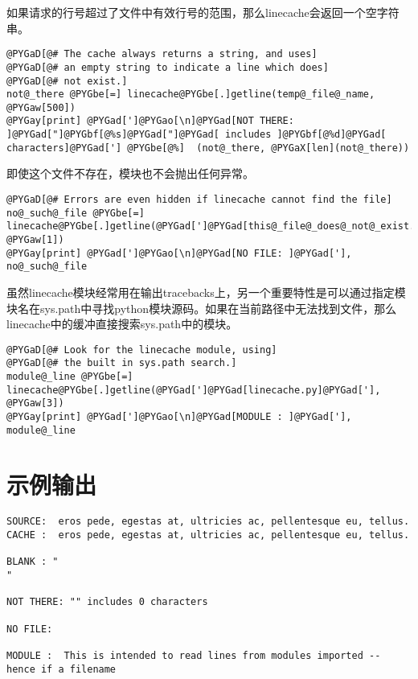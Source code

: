 \documentclass[a4paper,10pt,english]{manual}
\begin{document}
如果请求的行号超过了文件中有效行号的范围，那么linecache会返回一个空字符串。

\begin{Verbatim}[commandchars=@\[\]]
@PYGaD[@# The cache always returns a string, and uses]
@PYGaD[@# an empty string to indicate a line which does]
@PYGaD[@# not exist.]
not@_there @PYGbe[=] linecache@PYGbe[.]getline(temp@_file@_name, @PYGaw[500])
@PYGay[print] @PYGad[']@PYGao[\n]@PYGad[NOT THERE: ]@PYGad["]@PYGbf[@%s]@PYGad["]@PYGad[ includes ]@PYGbf[@%d]@PYGad[ characters]@PYGad['] @PYGbe[@%]  (not@_there, @PYGaX[len](not@_there))
\end{Verbatim}

即使这个文件不存在，模块也不会抛出任何异常。

\begin{Verbatim}[commandchars=@\[\]]
@PYGaD[@# Errors are even hidden if linecache cannot find the file]
no@_such@_file @PYGbe[=] linecache@PYGbe[.]getline(@PYGad[']@PYGad[this@_file@_does@_not@_exist.txt]@PYGad['], @PYGaw[1])
@PYGay[print] @PYGad[']@PYGao[\n]@PYGad[NO FILE: ]@PYGad['], no@_such@_file
\end{Verbatim}

虽然linecache模块经常用在输出tracebacks上，另一个重要特性是可以通过指定模块名在sys.path中寻找python模块源码。如果在当前路径中无法找到文件，那么linecache中的缓冲直接搜索sys.path中的模块。

\begin{Verbatim}[commandchars=@\[\]]
@PYGaD[@# Look for the linecache module, using]
@PYGaD[@# the built in sys.path search.]
module@_line @PYGbe[=] linecache@PYGbe[.]getline(@PYGad[']@PYGad[linecache.py]@PYGad['], @PYGaw[3])
@PYGay[print] @PYGad[']@PYGao[\n]@PYGad[MODULE : ]@PYGad['], module@_line
\end{Verbatim}


\section{示例输出}

\begin{Verbatim}[commandchars=@\[\]]
SOURCE:  eros pede, egestas at, ultricies ac, pellentesque eu, tellus.
CACHE :  eros pede, egestas at, ultricies ac, pellentesque eu, tellus.

BLANK : "
"

NOT THERE: "" includes 0 characters

NO FILE:

MODULE :  This is intended to read lines from modules imported -- hence if a filename
\end{Verbatim}
\end{document}
